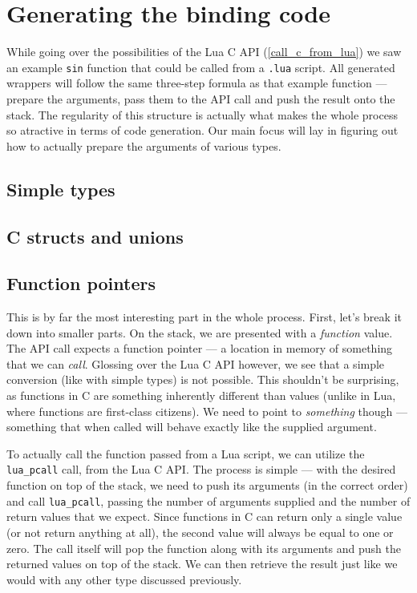 \documentclass[polish, english]{iithesis}
\begin{document}
\chapter{Generating the binding code}
  While going over the possibilities of the Lua C API (\ref{call_c_from_lua}) we saw an example \texttt{sin} function that could be called from a \texttt{.lua} script.
  All generated wrappers will follow the same three-step formula as that example function --- prepare the arguments, pass them to the API call and push the result onto the stack.
  The regularity of this structure is actually what makes the whole process so atractive in terms of code generation.
  Our main focus will lay in figuring out how to actually prepare the arguments of various types.
  \section{Simple types}
  \section{C structs and unions}
  \section{Function pointers}
    This is by far the most interesting part in the whole process.
    First, let's break it down into smaller parts.
    On the stack, we are presented with a \textit{function} value.
    The API call expects a function pointer --- a location in memory of something that we can \textit{call}.
    Glossing over the Lua C API however, we see that a simple conversion (like with simple types) is not possible.
    This shouldn't be surprising, as functions in C are something inherently different than values (unlike in Lua, where functions are first-class citizens).
    We need to point to \textit{something} though --- something that when called will behave exactly like the supplied argument.

    To actually call the function passed from a Lua script, we can utilize the \texttt{lua\_pcall} call, from the Lua C API.
    The process is simple --- with the desired function on top of the stack, we need to push its arguments (in the correct order) and call \texttt{lua\_pcall}, passing the number of arguments supplied and the number of return values that we expect.
    Since functions in C can return only a single value (or not return anything at all), the second value will always be equal to one or zero.
    The call itself will pop the function along with its arguments and push the returned values on top of the stack.
    We can then retrieve the result just like we would with any other type discussed previously.
\end{document}
